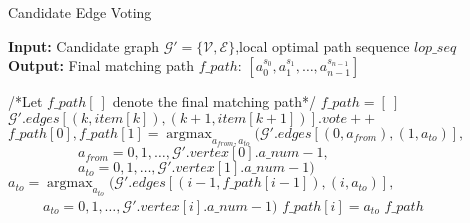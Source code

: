 \documentclass[a4paper,12pt]{article}
\begin{document}
 
\begin{CJK}{UTF8}{gbsn} 
\begin{algorithm} 
    \setcounter{algorithm}{1}
    \caption{Candidate Edge Voting} 
    \hspace*{0.02in} {\bf Input:} Candidate graph $\mathcal{G}'=\{\mathcal{V},\mathcal{E}\}$,local optimal path sequence $lop\_seq$ \\ 
    \hspace*{0.02in} {\bf Output:} Final matching path $f\_path$: $[a_0^{s_0},a_1^{s_1},\dots,a_{n-1}^{s_{n-1}}]$
    \begin{algorithmic}[1]
    \iffalse
    \fi
	\State /*Let $f\_path[\ ]$ denote the final matching path*/
	\State $f\_path=[\ ]$
					\State $\mathcal{G}'.edges[(k,item[k]),(k+1,item[k+1])].vote++$
				\EndFor
			\EndFor
        \EndFor
	\State $f\_path[0],f\_path[1]=\mathop{\mathrm{argmax}}_{a_{from},a_{to}}{(\mathcal{G}'.edges[(0,a_{from}),(1,a_{to})],}$
	\State $\qquad \qquad \quad a_{from}=0,1,\dots,\mathcal{G}'.vertex[0].a\_num-1,$
	\State $\qquad \qquad \quad a_{to}=0,1,\dots,\mathcal{G}'.vertex[1].a\_num-1)$
		\State $a_{to} = \mathop{\mathrm{argmax}}_{a_{to}}{(\mathcal{G}'.edges[(i-1,f\_path[i-1]),(i,a_{to})],}$
		\State $\qquad \, \, \, a_{to}=0,1,\dots,\mathcal{G}'.vertex[i].a\_num-1)$
		\State $f\_path[i]=a_{to}$
	\EndFor
	\State \Return $f\_path$
    \end{algorithmic} 
\end{algorithm}
\end{CJK} 
\end{document}
